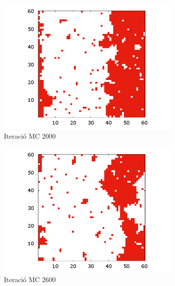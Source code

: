 \documentclass[a4paper]{article}
\begin{document}
\begin{figure}[H]
    \centering
    \begin{subfigure}{.24\textwidth}
        \centering
        \includegraphics[width=\textwidth]{SIM-L-060-TEMP-2000_40-CEVO.png}
        \caption{Iteració MC 2000}
        \label{fig:conf_2k}
    \end{subfigure}
    \begin{subfigure}{.24\textwidth}
        \centering
        \includegraphics[width=\textwidth]{SIM-L-060-TEMP-2000_52-CEVO.png}
        \caption{Iteració MC 2600}
        \label{fig:conf_2k6}
    \end{subfigure}
    \begin{subfigure}{.24\textwidth}

\end{subfigure}
\end{figure}
\end{document}
